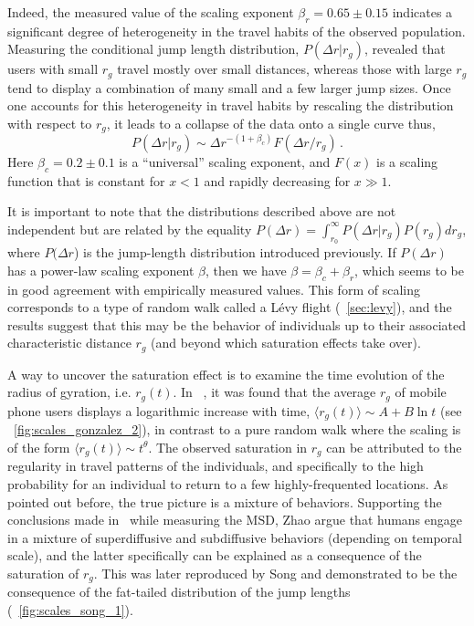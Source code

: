 Indeed, the measured value of the scaling exponent $\beta_r = 0.65 \pm 0.15$ indicates a significant degree of heterogeneity in the travel habits of the observed population. Measuring the conditional jump length distribution, $P(\Delta r | r_g)$, revealed that users with small $r_g$ travel mostly over small distances, whereas those with large $r_g$ tend to display a combination of many small and a few larger jump sizes. Once one accounts for this heterogeneity in travel habits by rescaling the distribution with respect to $r_g$, it leads to a collapse of the data onto a single curve thus,
%
\begin{equation}\label{eq:rgcoll}
P(\Delta r| r_g )  \sim \Delta r^{-(1+\beta_c)} F(\Delta r / r_g) \, .
\end{equation}
%
Here $\beta_c = 0.2 \pm 0.1$ is a ``universal'' scaling exponent, and $F(x)$ is a scaling function that is constant for $x<1$ and rapidly decreasing for $x \gg 1$. 

It is important to note that the distributions described above are not independent but are related by the equality $P(\Delta r) = \int_{r_0}^{\infty} P(\Delta r | r_g) P(r_g) d r_g$, where $P(\Delta r$) is the jump-length distribution introduced previously. If $P(\Delta r)$ has a power-law scaling exponent $\beta$, then we have $\beta = \beta_c + \beta_r$, which seems to be in good agreement with empirically measured values. 
This form of scaling corresponds to a type of random walk called a L\'evy flight (\sectionname~\ref{sec:levy}), and the results suggest that this may be the behavior of individuals up to their associated characteristic distance $r_g$ (and beyond which saturation effects take over). 

A way to uncover the saturation effect is to examine the time evolution of the radius of gyration, i.e. $r_g(t)$. 
In ~\cite{gonzalez_2008_understanding}, it was found that the average $r_g$ of mobile phone users displays a logarithmic increase with time, $\langle r_g(t) \rangle \sim A + B \ln t$ (see \figurename~\ref{fig:scales_gonzalez_2}), in contrast to a pure random walk where the scaling is of the form $\langle r_g(t) \rangle \sim t^{\theta}$. The observed saturation in $r_g$ can be attributed to the regularity in travel patterns of the individuals, and specifically to the high probability for an individual to return to a few highly-frequented locations. As pointed out before, the true picture is a mixture of behaviors. Supporting the conclusions made in~\cite{shin_2008_levy} while measuring the $\mathrm{MSD}$, Zhao \et\cite{zhao_2008_empirical} argue that humans engage in a mixture of superdiffusive and subdiffusive behaviors (depending on temporal scale), and the latter specifically can be explained as a consequence of the saturation of $r_g$. This was later reproduced by Song \et\cite{song_2010_modelling} and demonstrated to be the consequence of the fat-tailed distribution of the jump lengths (\figurename~\ref{fig:scales_song_1}). 


